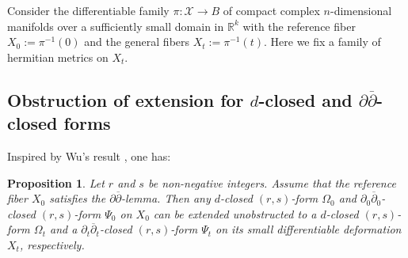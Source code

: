 \documentclass[12pt]{amsart}
\numberwithin{equation}{section}
\newtheorem{proposition}[theorem]{Proposition}
\renewcommand{\1}{\mathds{1}}
\newcommand{\db}{\overline{\partial}}
\renewcommand{\>}{\rightarrow}
\newcommand{\p}{\partial}
\def\p{\partial}
\begin{document}
Consider the differentiable family $\pi: \mathcal{X} \rightarrow
B$ of compact complex $n$-dimensional manifolds
over a sufficiently small domain in $\mathbb{R}^k$ with the
reference fiber $X_0:= \pi^{-1}(0)$ and the general fibers $X_t:=
\pi^{-1}(t).$ Here we fix a family of
hermitian metrics on $X_t$.
\subsection{Obstruction of extension for $d$-closed and $\p\db$-closed forms}
\label{d-closed}
Inspired by Wu's result \cite[Theorem 5.13]{w}, one has:
\begin{proposition}\label{d-ext}
Let $r$ and $s$ be non-negative integers. Assume that the reference
fiber $X_0$ satisfies the $\p\db$-lemma. Then any $d$-closed
$(r,s)$-form $\Omega_0$ and $\p_0\db_0$-closed $(r,s)$-form $\Psi_0$
on $X_0$ can be extended unobstructed to a $d$-closed $(r,s)$-form
$\Omega_t$ and a $\p_t\db_t$-closed $(r,s)$-form $\Psi_t$ on its
small differentiable deformation $X_t$, respectively.
\end{proposition}
\end{document}
